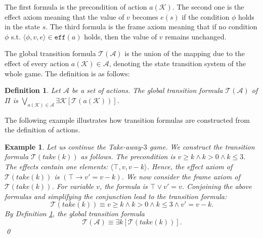 \documentclass[review]{elsarticle}
\newcommand{\tuple}[1]{\langle {#1} \rangle}
\newcommand{\true}{\top}
\newcommand{\actparm}{\mathcal{K}}
\newcommand{\act}{\mathcal{A}}
\newcommand{\trans}{\mathcal{T}}
\newcommand{\eff}{\mathtt{eff}}
\newcommand{\con}{\phi}
\newtheorem{definition}{Definition}
\newtheorem{example}{Example}
\begin{document}
    The first formula is the precondition of action $a(\actparm)$.
    The second one is the effect axiom meaning that the value of $v$ becomes $e(s)$ if the condition $\con$ holds in the state $s$.
    The third formula is the frame axiom meaning that if no condition $\con$ s.t. $\tuple{\con, v, e} \in \eff(a)$ holds, then the value of $v$ remains unchanged. 
    
    The global transition formula $\trans(\act)$ is the union of the mapping due to the effect of every action $a(\actparm) \in \act$, denoting the state transition system of the whole game.
    The definition is as follows:
    
    \begin{definition}\label{def:globalTransForm} \rm
    	Let $\act$ be a set of actions.
    	The global transition formula $\trans(\act)$ of $\Pi$ is $\bigvee_{a(\actparm) \in \act} \exists \actparm [\trans(a(\actparm))]$.
    \end{definition}
    
    The following example illustrates how transition formulas are constructed from the definition of actions.
    \begin{example}\label{exm:transForm} \rm
    	Let us continue the Take-away-$3$ game.
    	We construct the transition formula $\trans(take(k))$ as follows.
    	The precondition is $v \geq k \land k > 0 \land k \leq 3$.
    	The effects contain one elements: $\tuple{\true, v, v - k}$.
    	Hence, the effect axiom of $\trans(take(k))$ is $(\true \rightarrow v' = v - k)$.
    	We now consider the frame axiom of $\trans(take(k))$.
    	For variable $v$, the formula is $\true \lor v' = v $.
    	Conjoining the above formulas and simplifying the conjunction lead to the transition formula: 
    	\[\trans(take(k)) \equiv v \geq k \land k > 0 \land k \leq 3 \land v' = v - k.\]
    	By Definition \ref{def:globalTransForm}, the global transition formula
    	\[\trans(\act) \equiv \exists k [\trans(take(k))].\]  	\qed
    \end{example}
    
	
\end{document}
